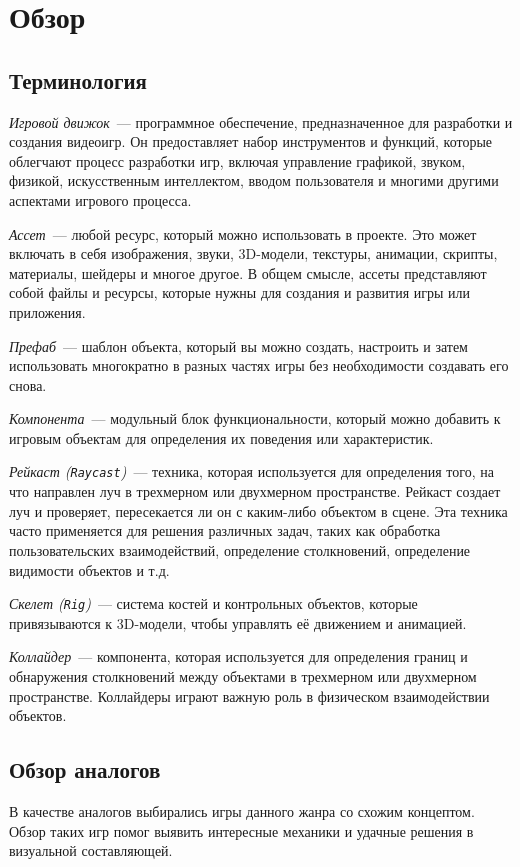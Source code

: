 
\section{Обзор}
\label{sec:relatedworks}

\subsection{Терминология}
\textit{Игровой движок}~--- программное обеспечение, предназначенное для разработки и создания видеоигр. Он предоставляет набор инструментов и функций, которые облегчают процесс разработки игр, включая управление графикой, звуком, физикой, искусственным интеллектом, вводом пользователя и многими другими аспектами игрового процесса.

\textit{Ассет}~--- любой ресурс, который можно использовать в проекте. Это может включать в себя изображения, звуки, 3D-модели, текстуры, анимации, скрипты, материалы, шейдеры и многое другое. В общем смысле, ассеты представляют собой файлы и ресурсы, которые нужны для создания и развития игры или приложения.

\textit{Префаб}~--- шаблон объекта, который вы можно создать, настроить и затем использовать многократно в разных частях игры без необходимости создавать его снова.

\textit{Компонента}~--- модульный блок функциональности, который можно добавить к игровым объектам для определения их поведения или характеристик.

\textit{Рейкаст (\texttt{Raycast})}~--- техника, которая используется для определения того, на что направлен луч в трехмерном или двухмерном пространстве. Рейкаст создает луч и проверяет, пересекается ли он с каким-либо объектом в сцене. Эта техника часто применяется для решения различных задач, таких как обработка пользовательских взаимодействий, определение столкновений, определение видимости объектов и т.д.

\textit{Скелет (\texttt{Rig})}~--- система костей и контрольных объектов, которые привязываются к 3D-модели, чтобы управлять её движением и анимацией.

\textit{Коллайдер}~--- компонента, которая используется для определения границ и обнаружения столкновений между объектами в трехмерном или двухмерном пространстве. Коллайдеры играют важную роль в физическом взаимодействии объектов.


\subsection{Обзор аналогов}
В качестве аналогов выбирались игры данного жанра со схожим концептом. Обзор таких игр помог выявить интересные механики и удачные решения в визуальной составляющей.

